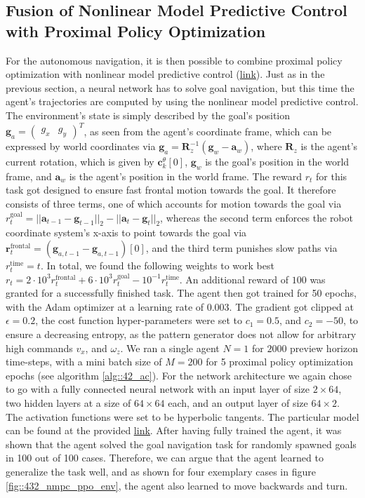 \subsection{Fusion of Nonlinear Model Predictive Control with Proximal Policy Optimization}
\label{sec::431_fpp}
For the autonomous navigation, it is then possible to combine proximal policy optimization with nonlinear model predictive control (\href{https://github.com/mhubii/nmpc_pattern_generator/blob/dev/src/train_ppo_nmpc.cpp}{\underline{link}}). Just as in the previous section, a neural network has to solve goal navigation, but this time the agent's trajectories are computed by using the nonlinear model predictive control. The environment's state is simply described by the goal's position $\bm{g}_a=\begin{pmatrix}
g_x & g_y
\end{pmatrix}^T$, as seen from the agent's coordinate frame, which can be expressed by world coordinates via $\bm{g}_a = \bm{R}^{-1}_z(\bm{g}_w-\bm{a}_w)$, where $\bm{R}_z$ is the agent's current rotation, which is given by $\bm{c}_k^\theta[0]$, $\bm{g}_w$ is the goal's position in the world frame, and $\bm{a}_w$ is the agent's position in the world frame. The reward $r_t$ for this task got designed to ensure fast frontal motion towards the goal. It therefore consists of three terms, one of which accounts for motion towards the goal via $r_t^\text{goal} = ||\bm{a}_{t-1}-\bm{g}_{t-1}||_2 - ||\bm{a}_t-\bm{g}_t||_2$, whereas the second term enforces the robot coordinate system's x-axis to point towards the goal via $\bm{r}_t^\text{frontal} = (\bm{g}_{a,t-1}-\bm{g}_{a,t-1})[0]$, and the third term punishes slow paths via $r_t^\text{time}=t$. In total, we found the following weights to work best $r_t=2\cdot10^3r_t^\text{frontal}+6\cdot10^3r_t^\text{goal}-10^{-1}r_t^\text{time}$. An additional reward of $100$ was granted for a successfully finished task. The agent then got trained for 50 epochs, with the Adam optimizer at a learning rate of 0.003. The gradient got clipped at $\epsilon=0.2$, the cost function hyper-parameters were set to $c_1=0.5$, and $c_2=-50$, to ensure a decreasing entropy, as the pattern generator does not allow for arbitrary high commands $v_x$, and $\omega_z$. We ran a single agent $N=1$ for $2000$ preview horizon time-steps, with a mini batch size of $M=200$ for 5 proximal policy optimization epochs (see algorithm \ref{alg::42_ac}). For the network architecture we again chose to go with a fully connected neural network with an input layer of size $2\times64$, two hidden layers at a size of $64\times64$ each, and an output layer of size $64\times2$. The activation functions were set to be hyperbolic tangents. The particular model can be found at the provided \href{https://github.com/mhubii/nmpc_pattern_generator/blob/df058feeb5ba3afd88f2a855e5af148d25c23020/libs/learning/include/learning/models.h#L100}{\underline{link}}. After having fully trained the agent, it was shown that the agent solved the goal navigation task for randomly spawned goals in 100 out of 100 cases. Therefore, we can argue that the agent learned to generalize the task well, and as shown for four exemplary cases in figure \ref{fig::432_nmpc_ppo_env}, the agent also learned to move backwards and turn. 
